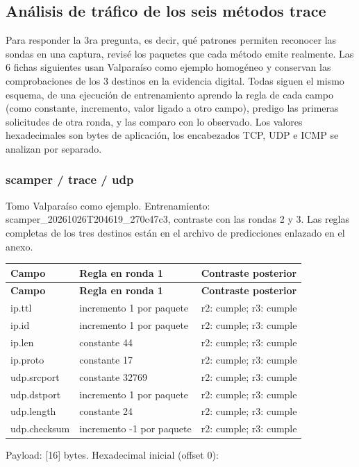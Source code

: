 \subsection{Análisis de tráfico de los seis métodos trace}\label{sec:trace-patrones}

Para responder la 3ra pregunta, es decir, qué patrones permiten reconocer las sondas en una captura, revisé los paquetes que cada método emite realmente. Las 6 fichas siguientes usan Valparaíso como ejemplo homogéneo y conservan las comprobaciones de los 3 destinos en la evidencia digital. Todas siguen el mismo esquema, de una ejecución de entrenamiento aprendo la regla de cada campo (como constante, incremento, valor ligado a otro campo), predigo las primeras solicitudes de otra ronda, y las comparo con lo observado. Los valores hexadecimales son bytes de aplicación, los encabezados TCP, UDP e ICMP se analizan por separado.


\subsubsection{scamper / trace / udp}

Tomo Valparaíso como ejemplo. Entrenamiento:  scamper\_\allowbreak{}20261026T204619\_\allowbreak{}270c47c3, contraste con las rondas 2 y 3. Las reglas completas de los tres destinos están en el archivo de predicciones enlazado en el anexo.

\begingroup
\fontsize{9}{11}\selectfont
\addtocounter{table}{-1}
\begin{longtable}{p{3.1cm}p{5.8cm}p{5.1cm}}
\toprule
\textbf{Campo} & \textbf{Regla en ronda 1} & \textbf{Contraste posterior} \\ \midrule
\endfirsthead
\toprule
\textbf{Campo} & \textbf{Regla en ronda 1} & \textbf{Contraste posterior} \\ \midrule
\endhead
ip.ttl & incremento 1 por paquete & r2: cumple; r3: cumple \\
ip.id & incremento 1 por paquete & r2: cumple; r3: cumple \\
ip.len & constante 44 & r2: cumple; r3: cumple \\
ip.proto & constante 17 & r2: cumple; r3: cumple \\
udp.srcport & constante 32769 & r2: cumple; r3: cumple \\
udp.dstport & incremento 1 por paquete & r2: cumple; r3: cumple \\
udp.length & constante 24 & r2: cumple; r3: cumple \\
udp.checksum & incremento -1 por paquete & r2: cumple; r3: cumple \\
\bottomrule
\end{longtable}
\endgroup
Payload: [16] bytes. Hexadecimal inicial (offset 0):

